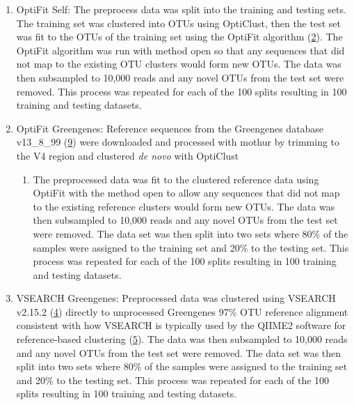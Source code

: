 \documentclass[
]{article}
\providecommand{\tightlist}{%
  \setlength{\itemsep}{0pt}\setlength{\parskip}{0pt}}
\begin{document}
\begin{enumerate}
\def\labelenumi{\arabic{enumi}.}
\tightlist
\item
  OptiFit Self: The preprocess data was split into the training and
  testing sets. The training set was clustered into OTUs using
  OptiClust, then the test set was fit to the OTUs of the training set
  using the OptiFit algorithm (\protect\hyperlink{ref-sovacool2022}{2}).
  The OptiFit algorithm was run with method open so that any sequences
  that did not map to the existing OTU clusters would form new OTUs. The
  data was then subsampled to 10,000 reads and any novel OTUs from the
  test set were removed. This process was repeated for each of the 100
  splits resulting in 100 training and testing datasets.
\item
  OptiFit Greengenes: Reference sequences from the Greengenes database
  v13\_8\_99 (\protect\hyperlink{ref-desantis2006}{9}) were downloaded
  and processed with mothur by trimming to the V4 region and clustered
  \emph{de novo} with OptiClust

  \begin{enumerate}
  \def\labelenumii{\arabic{enumii}.}
  \tightlist
  \item
    The preprocessed data was fit to the clustered reference data using
    OptiFit with the method open to allow any sequences that did not map
    to the existing reference clusters would form new OTUs. The data was
    then subsampled to 10,000 reads and any novel OTUs from the test set
    were removed. The data set was then split into two sets where 80\%
    of the samples were assigned to the training set and 20\% to the
    testing set. This process was repeated for each of the 100 splits
    resulting in 100 training and testing datasets.
  \end{enumerate}
\item
  VSEARCH Greengenes: Preprocessed data was clustered using VSEARCH
  v2.15.2 (\protect\hyperlink{ref-rognes2016}{4}) directly to
  unprocessed Greengenes 97\% OTU reference alignment consistent with
  how VSEARCH is typically used by the QIIME2 software for
  reference-based clustering (\protect\hyperlink{ref-bolyen2019}{5}).
  The data was then subsampled to 10,000 reads and any novel OTUs from
  the test set were removed. The data set was then split into two sets
  where 80\% of the samples were assigned to the training set and 20\%
  to the testing set. This process was repeated for each of the 100
  splits resulting in 100 training and testing datasets.
\end{enumerate}
\end{document}
